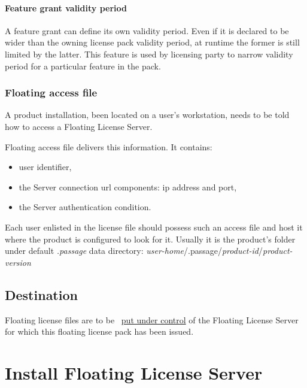 \documentclass[12pt]{report}
\begin{document}
\subsubsection*{Feature grant validity period} \label{sec:flp-content-valid}
A feature grant can define its own validity period. 
Even if it is declared to be wider than the owning license pack validity period, at runtime the former is still limited by the latter.
This feature is used by licensing party to narrow validity period for a particular feature in the pack.

\subsection*{Floating access file} \label{sec:flp-content-access}
A product installation, been located on a user's workstation, needs to be told how to access a Floating License Server.

Floating access file delivers this information. It contains:
\begin{itemize}
  \item user identifier,
  \item the Server connection url components: ip address and port,
  \item the Server authentication condition.
\end{itemize} 

Each user enlisted in the license file should possess such an access file and host it where the product is configured to look for it.
Usually it is the product's folder under default \textit{.passage} data directory: \textit{user-home}/.passage/\textit{product-id}/\textit{product-version} 

\section*{Destination} \label{sec:flp-destination}

Floating license files are to be ~\hyperref[sec:fls-commands-upload]{put under control} of the Floating License Server for which this floating license pack has been issued.

\chapter*{Install Floating License Server} \label{ch:install-fls}
\end{document}
